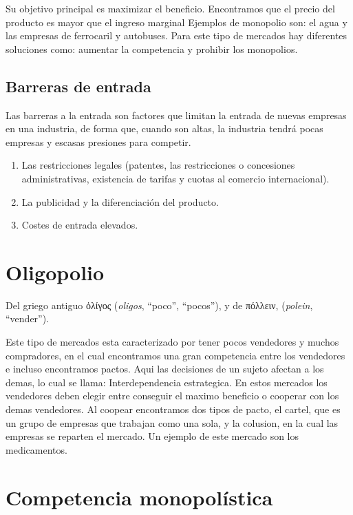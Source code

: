 \documentclass[
]{krantz}
\providecommand{\tightlist}{%
  \setlength{\itemsep}{0pt}\setlength{\parskip}{0pt}}
\begin{document}
Su objetivo principal es maximizar el beneficio. Encontramos que el precio del producto es mayor que el ingreso marginal
Ejemplos de monopolio son: el agua y las empresas de ferrocaril y autobuses.
Para este tipo de mercados hay diferentes soluciones como: aumentar la competencia y prohibir los monopolios.

\hypertarget{barreras-de-entrada}{%
\subsection{Barreras de entrada}\label{barreras-de-entrada}}

Las barreras a la entrada son factores que limitan la entrada de nuevas empresas en una industria, de forma que, cuando son altas, la industria tendrá pocas empresas y escasas presiones para competir.

\begin{enumerate}
\def\labelenumi{\arabic{enumi}.}
\tightlist
\item
  Las restricciones legales (patentes, las restricciones o concesiones administrativas, existencia de tarifas y cuotas al comercio internacional).
\item
  La publicidad y la diferenciación del producto.
\item
  Costes de entrada elevados.
\end{enumerate}

\hypertarget{oligopolio}{%
\section{Oligopolio}\label{oligopolio}}

Del griego antiguo ὀλίγος (\emph{oligos}, ``poco'', ``pocos''), y de πόλλειν, (\emph{polein}, ``vender'').

Este tipo de mercados esta caracterizado por tener pocos vendedores y muchos compradores, en el cual encontramos una gran competencia entre los vendedores e incluso encontramos pactos. Aqui las decisiones de un sujeto afectan a los demas, lo cual se llama: Interdependencia estrategica.
En estos mercados los vendedores deben elegir entre conseguir el maximo beneficio o cooperar con los demas vendedores. Al coopear encontramos dos tipos de pacto, el cartel, que es un grupo de empresas que trabajan como una sola, y la colusion, en la cual las empresas se reparten el mercado.
Un ejemplo de este mercado son los medicamentos.

\hypertarget{competencia-monopoluxedstica}{%
\section{Competencia monopolística}\label{competencia-monopoluxedstica}}
\end{document}
